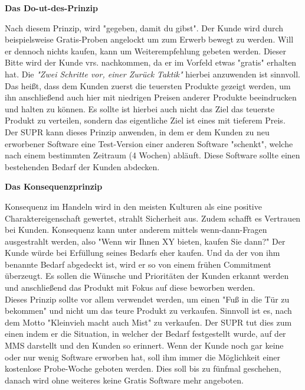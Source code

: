 \begin{large}
	\textbf{Das Do-ut-des-Prinzip}\cite[S. 33fff.]{vkPsy} \\
\end{large}
Nach diesem Prinzip, wird "gegeben, damit du gibst". Der Kunde wird durch beispielsweise Gratis-Proben angelockt um zum Erwerb bewegt zu werden. Will er dennoch nichts kaufen, kann um Weiterempfehlung gebeten werden. Dieser Bitte wird der Kunde vrs. nachkommen, da er im Vorfeld etwas "gratis" erhalten hat. Die \textit{"Zwei Schritte vor, einer Zurück Taktik"} hierbei anzuwenden ist sinnvoll. Das heißt, dass dem Kunden zuerst die teuersten Produkte gezeigt werden, um ihn anschließend auch hier mit niedrigen Preisen anderer Produkte beeindrucken und halten zu können. Es sollte ist hierbei auch nicht das Ziel das teuerste Produkt zu verteilen, sondern das eigentliche Ziel ist eines mit tieferem Preis.\\
Der SUPR kann dieses Prinzip anwenden, in dem er dem Kunden zu neu erworbener Software eine Test-Version einer anderen Software "schenkt", welche nach einem bestimmten Zeitraum (4 Wochen) abläuft. Diese Software sollte einen bestehenden Bedarf der Kunden abdecken.\\

\begin{large}
	\textbf{Das Konsequenzprinzip}\\
\end{large}
Konsequenz im Handeln wird in den meisten Kulturen als eine positive Charaktereigenschaft gewertet, strahlt Sicherheit aus. Zudem schafft es Vertrauen bei Kunden. Konsequenz kann unter anderem mittels wenn-dann-Fragen ausgestrahlt werden, also "Wenn wir Ihnen XY bieten, kaufen Sie dann?" Der Kunde würde bei Erfüllung seines Bedarfs eher kaufen. Und da der von ihm benannte Bedarf abgedeckt ist, wird er so von einem frühen Commitment überzeugt. Es sollen die Wünsche und Prioritäten der Kunden erkannt werden und anschließend das Produkt mit Fokus auf diese beworben werden.\\
Dieses Prinzip sollte vor allem verwendet werden, um einen "Fuß in die Tür zu bekommen" und nicht um das teure Produkt zu verkaufen. Sinnvoll ist es, nach dem Motto "Kleinvieh macht auch Mist" zu verkaufen. Der SUPR tut dies zum einen indem er die Situation, in welcher der Bedarf festgestellt wurde, auf der MMS darstellt und den Kunden so erinnert. Wenn der Kunde noch gar keine oder nur wenig Software erworben hat, soll ihm immer die Möglichkeit einer kostenlose Probe-Woche geboten werden. Dies soll bis zu fünfmal geschehen, danach wird ohne weiteres keine Gratis Software mehr angeboten.\\

